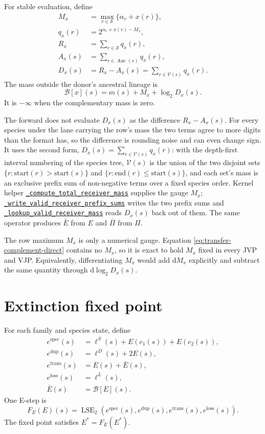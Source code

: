 \documentclass[11pt]{article}
\newcommand{\LSE}{\operatorname{LSE}_2}
\newcommand{\Anc}{\operatorname{Anc}}
\newcommand{\dd}{\mathrm{d}}
\newcommand{\kernelref}[2]{\href{../../gpurec/core/kernels/#1}{\nolinkurl{#2}}}
\begin{document}
For stable evaluation, define
\begin{align}
  M_x &= \max_{r\in\mathcal S}\{\alpha_r+x(r)\}, \\
  q_x(r)&=2^{\alpha_r+x(r)-M_x},\\
  R_x &= \sum_{r\in\mathcal S}q_x(r), \\
  A_x(s) &= \sum_{r\in\Anc(s)}q_x(r),\\
  D_x(s)&=R_x-A_x(s)
         =\sum_{r\in\mathcal V(s)}q_x(r).
\end{align}
The mass outside the donor's ancestral lineage is
\begin{equation}
  \mathcal B[x](s)
  = m(s)+M_x+\log_2 D_x(s).
  \label{eq:transfer-complement}
\end{equation}
It is $-\infty$ when the complementary mass is zero.

The forward does not evaluate $D_x(s)$ as the difference $R_x-A_x(s)$.  For every species
under the lane carrying the row's mass the two terms agree to more digits than the format
has, so the difference is rounding noise and can even change sign.  It uses the second form,
$D_x(s)=\sum_{r\in\mathcal V(s)}q_x(r)$: with the depth-first interval numbering of the
species tree, $\mathcal V(s)$ is the union of the two disjoint sets $\{r:\text{start}(r)>
\text{start}(s)\}$ and $\{r:\text{end}(r)\le\text{start}(s)\}$, and each set's mass is an
exclusive prefix sum of non-negative terms over a fixed species order.  Kernel helper
\kernelref{pi_forward.py}{_compute_total_receiver_mass} supplies the gauge $M_x$;
\kernelref{pi_forward.py}{_write_valid_receiver_prefix_sums} writes the two prefix sums and
\kernelref{pi_forward.py}{_lookup_valid_receiver_mass} reads $D_x(s)$ back out of them.
The same operator produces $\bar E$ from $E$ and $\bar\Pi$ from $\Pi$.

The row maximum $M_x$ is only a numerical gauge.  Equation
\eqref{eq:transfer-complement-direct} contains no $M_x$, so it is exact to hold
$M_x$ fixed in every JVP and VJP.  Equivalently, differentiating $M_x$ would
add $\dd M_x$ explicitly and subtract the same quantity through
$\dd\log_2 D_x(s)$.

\section{Extinction fixed point}

For each family and species state, define
\begin{align}
  e^{\mathrm{spec}}(s) &= \ell^S(s)+E(c_1(s))+E(c_2(s)), \\
  e^{\mathrm{dup}}(s) &= \ell^D(s)+2E(s), \\
  e^{\mathrm{trans}}(s) &= E(s)+\bar E(s), \\
  e^{\mathrm{loss}}(s) &= \ell^L(s), \\
  \bar E(s) &= \mathcal B[E](s).
\end{align}
One E-step is
\begin{equation}
  F_E(E)(s)=\LSE\!\left(
    e^{\mathrm{spec}}(s),e^{\mathrm{dup}}(s),
    e^{\mathrm{trans}}(s),e^{\mathrm{loss}}(s)
  \right).
  \label{eq:e-step}
\end{equation}
The fixed point satisfies $E^*=F_E(E^*)$.
\end{document}
